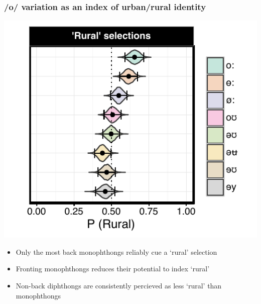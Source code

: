 \documentclass[a0,final]{a0poster}
\begin{document}
\begin{multicols*}{4}
\subsubsection*{/o/ variation as an index of urban/rural identity}
\begin{minipage}{0.12\textwidth}
\hspace*{-2.75cm}
\vspace*{-2.75cm}
\includegraphics[scale=2.2]{ow_rural_effects.pdf}
\end{minipage}
\hspace*{1.5cm}
\begin{minipage}{0.11\textwidth}
\vspace*{-4cm}
\raggedright
\begin{itemize}
\item{Only the most back monophthongs reliably cue a `rural' selection}
\item{Fronting monophthongs reduces their potential to index `rural'}
\item{Non-back diphthongs are consistently percieved as less `rural' than monophthongs}
\end{itemize}
\end{minipage}

\end{multicols*}
\end{document}
